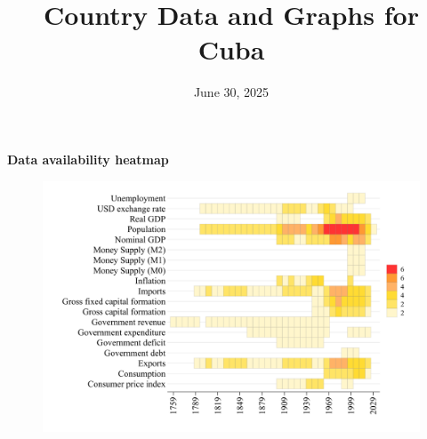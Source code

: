 \documentclass[12pt,a4paper,landscape]{article}
\begin{document}
\title{\Large Country Data and Graphs for Cuba}
\date{June 30, 2025}
\maketitle
\thispagestyle{empty}

\clearpage
\setcounter{page}{1}
\hypersetup{colorlinks=true,linkcolor=blue,linktoc=all}
\label{toc}
\tableofcontents
\thispagestyle{empty}
\clearpage
{}
{}
\begin{center}
{\Large\bfseries Data availability heatmap}
\end{center}
\vspace{1cm}
\begin{figure}[H]
\centering
\includegraphics[width=\textwidth,height=0.8\textheight,keepaspectratio]{graphs/CUB_heatmap.pdf}
\end{figure}
\setcounter{page}{3}
\end{document}
